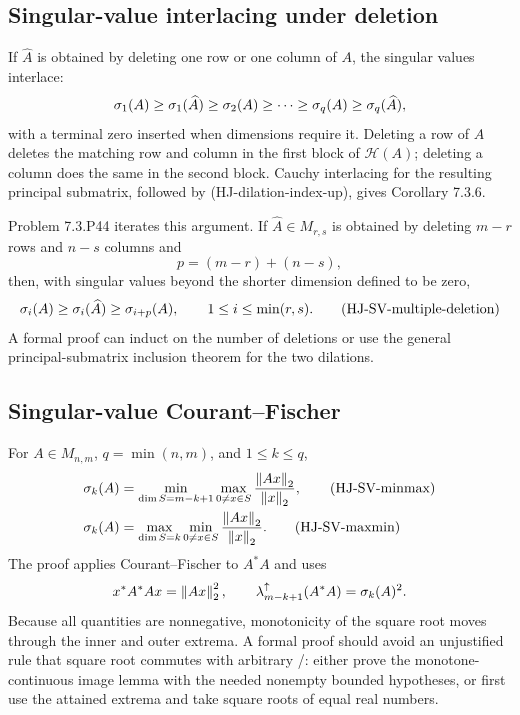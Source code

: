 \subsection{Singular-value interlacing under deletion}

If $\widehat A$ is obtained by deleting one row or one column of $A$, the singular values interlace:
\[
  \sigma_1(A)\ge\sigma_1(\widehat A)\ge\sigma_2(A)
  \ge\cdots\ge\sigma_q(A)\ge\sigma_q(\widehat A),
\]
with a terminal zero inserted when dimensions require it. Deleting a row of $A$ deletes the matching row and column in the first block of $\mathcal H(A)$; deleting a column does the same in the second block. Cauchy interlacing for the resulting principal submatrix, followed by (HJ-dilation-index-up), gives Corollary 7.3.6.

Problem 7.3.P44 iterates this argument. If $\widehat A\in M_{r,s}$ is obtained by deleting $m-r$ rows and $n-s$ columns and
\[
  p=(m-r)+(n-s),
\]
then, with singular values beyond the shorter dimension defined to be zero,
\begin{equation}
  \sigma_i(A)\ge\sigma_i(\widehat A)\ge\sigma_{i+p}(A),
  \qquad 1\le i\le\min(r,s). \tag{HJ-SV-multiple-deletion}
\end{equation}
A formal proof can induct on the number of deletions or use the general principal-submatrix inclusion theorem for the two dilations.

\subsection{Singular-value Courant--Fischer}

For $A\in M_{n,m}$, $q=\min(n,m)$, and $1\le k\le q$,
\begin{align}
  \sigma_k(A)
  &=\min_{\dim S=m-k+1}\max_{0\ne x\in S}\frac{\left\lVert Ax\right\rVert_2}{\left\lVert x\right\rVert_2}, \tag{HJ-SV-minmax}\\
  \sigma_k(A)
  &=\max_{\dim S=k}\min_{0\ne x\in S}\frac{\left\lVert Ax\right\rVert_2}{\left\lVert x\right\rVert_2}. \tag{HJ-SV-maxmin}
\end{align}
The proof applies Courant--Fischer to $A^*A$ and uses
\[
  x^*A^*Ax=\left\lVert Ax\right\rVert_2^2,
  \qquad
  \lambda_{m-k+1}^{\uparrow}(A^*A)=\sigma_k(A)^2.
\]
Because all quantities are nonnegative, monotonicity of the square root moves through the inner and outer extrema. A formal proof should avoid an unjustified rule that square root commutes with arbitrary /: either prove the monotone-continuous image lemma with the needed nonempty bounded hypotheses, or first use the attained extrema and take square roots of equal real numbers.

